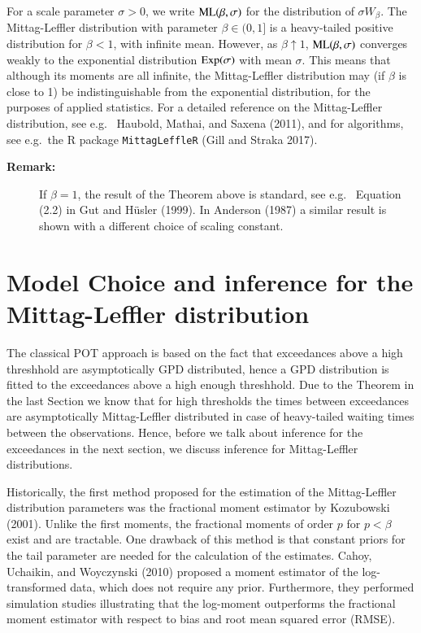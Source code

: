 \documentclass[]{elsarticle} %
\begin{document}
For a scale parameter \(\sigma > 0\), we write
\({\rm ML}(\beta, \sigma)\) for the distribution of \(\sigma W_\beta\).
The Mittag-Leffler distribution with parameter \(\beta \in (0,1]\) is a
heavy-tailed positive distribution for \(\beta < 1\), with infinite
mean. However, as \(\beta \uparrow 1\), \({\rm ML}(\beta, \sigma)\)
converges weakly to the exponential distribution \({\rm Exp}(\sigma)\)
with mean \(\sigma\). This means that although its moments are all
infinite, the Mittag-Leffler distribution may (if \(\beta\) is close to
1) be indistinguishable from the exponential distribution, for the
purposes of applied statistics. For a detailed reference on the
Mittag-Leffler distribution, see e.g.~ Haubold, Mathai, and Saxena
(2011), and for algorithms, see e.g.~the R package
\texttt{MittagLeffleR} (Gill and Straka 2017).

\begin{description}
\item[\textbf{Remark:}]
If \(\beta = 1\), the result of the Theorem above is standard, see e.g.~
Equation (2.2) in Gut and Hüsler (1999). In Anderson (1987) a similar
result is shown with a different choice of scaling constant.
\end{description}

\hypertarget{sec:ML}{%
\section{Model Choice and inference for the Mittag-Leffler
distribution}\label{sec:ML}}

The classical POT approach is based on the fact that exceedances above a
high threshhold are asymptotically GPD distributed, hence a GPD
distribution is fitted to the exceedances above a high enough
threshhold. Due to the Theorem in the last Section we know that for high
thresholds the times between exceedances are asymptotically
Mittag-Leffler distributed in case of heavy-tailed waiting times between
the observations. Hence, before we talk about inference for the
exceedances in the next section, we discuss inference for Mittag-Leffler
distributions.

Historically, the first method proposed for the estimation of the
Mittag-Leffler distribution parameters was the fractional moment
estimator by Kozubowski (2001). Unlike the first moments, the fractional
moments of order \(p\) for \(p<\beta\) exist and are tractable. One
drawback of this method is that constant priors for the tail parameter
are needed for the calculation of the estimates. Cahoy, Uchaikin, and
Woyczynski (2010) proposed a moment estimator of the log-transformed
data, which does not require any prior. Furthermore, they performed
simulation studies illustrating that the log-moment outperforms the
fractional moment estimator with respect to bias and root mean squared
error (RMSE).
\end{document}
